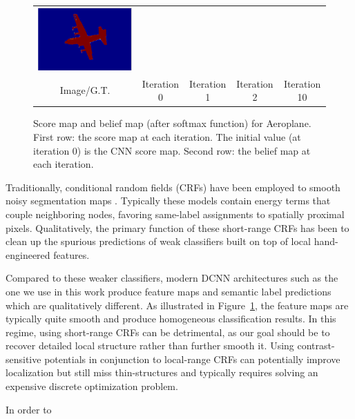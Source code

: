 \begin{figure}[ht]
\begin{tabular}{c c c c c}
    \includegraphics[width=0.16\linewidth]{fig/mean_field_illustration/Belief_Class1_Itr10.pdf} \\
    Image/G.T. & Iteration 0 & Iteration 1 & Iteration 2 & Iteration 10 \\
  \end{tabular}
  \caption{Score map and belief map (after softmax function) for Aeroplane. First row: the score map at each iteration. The initial value (at iteration 0) is the CNN score map. Second row: the belief map at each iteration. 
    }
  \label{fig:score-maps}
\end{figure}

Traditionally, conditional random fields (CRFs) have been employed to smooth
noisy segmentation maps \cite{rother2004grabcut, kohli2009robust}. Typically
these models contain energy terms that couple neighboring nodes, favoring
same-label assignments to spatially proximal pixels. Qualitatively, the
primary function of these short-range CRFs has been to clean up the spurious
predictions of weak classifiers built on top of local hand-engineered features.

Compared to these weaker classifiers, modern DCNN architectures such as
the one we use in this work produce feature maps and semantic label
predictions which are qualitatively different. As illustrated in
Figure~\ref{fig:score-maps}, the feature maps are typically quite smooth and
produce homogeneous classification results. In this regime, using short-range
CRFs can be detrimental, as our goal should be to recover detailed local
structure rather than further smooth it. Using contrast-sensitive potentials
\cite{rother2004grabcut} in conjunction to local-range CRFs can potentially
improve localization but still miss thin-structures and typically requires
solving an expensive discrete optimization problem.

In order to 

